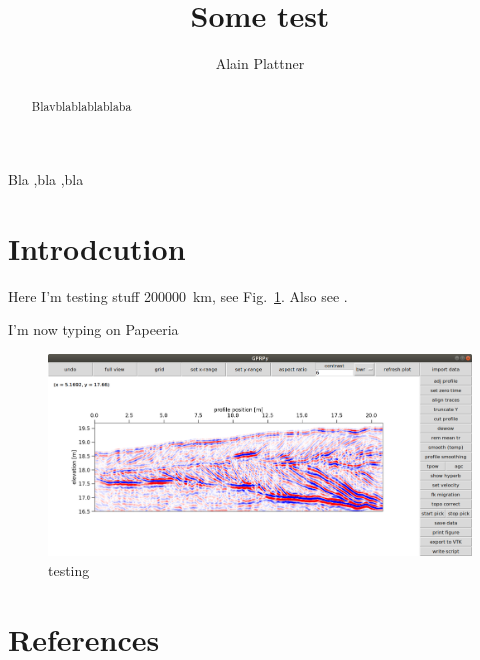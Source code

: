 \documentclass[authoryear,5p,times]{elsarticle}
\begin{document}
\begin{frontmatter}
  \title{Some test}

  \author[Alain]{Alain Plattner}
  \address[Alain]{Somewhere far away}

  \begin{abstract}
    Blavblablablablaba
  \end{abstract}

  \begin{keyword}
    Bla \sep bla \sep bla
  \end{keyword}
\end{frontmatter}

  
\section{Introdcution}

Here I'm testing stuff \SI{200000}{\kilo \meter}, see Fig.~\ref{bla}. Also see \cite{Peterson2525}.

I'm now typing on Papeeria

\begin{figure}[h]
  \includegraphics[width=\textwidth]{Figures/profileGUI.png}
  \caption{\label{bla} testing}
\end{figure}


\section*{References}


\end{document}
